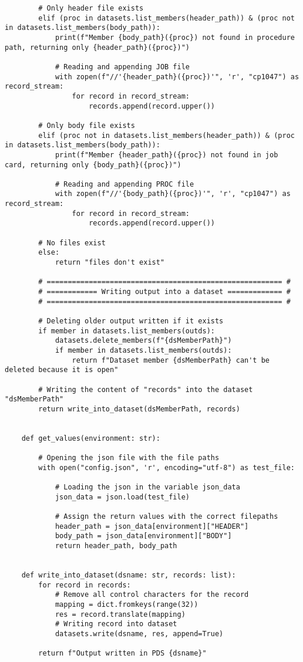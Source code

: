\begin{lstlisting}
        # Only header file exists
        elif (proc in datasets.list_members(header_path)) & (proc not in datasets.list_members(body_path)):
            print(f"Member {body_path}({proc}) not found in procedure path, returning only {header_path}({proc})")
            
            # Reading and appending JOB file
            with zopen(f"//'{header_path}({proc})'", 'r', "cp1047") as record_stream:
                for record in record_stream:
                    records.append(record.upper())
        
        # Only body file exists
        elif (proc not in datasets.list_members(header_path)) & (proc in datasets.list_members(body_path)):
            print(f"Member {header_path}({proc}) not found in job card, returning only {body_path}({proc})")
            
            # Reading and appending PROC file
            with zopen(f"//'{body_path}({proc})'", 'r', "cp1047") as record_stream:
                for record in record_stream:
                    records.append(record.upper())
                    
        # No files exist 
        else:
            return "files don't exist"
        
        # ======================================================== #
        # ============ Writing output into a dataset ============= #
        # ======================================================== #
        
        # Deleting older output written if it exists
        if member in datasets.list_members(outds):
            datasets.delete_members(f"{dsMemberPath}")
            if member in datasets.list_members(outds):
                return f"Dataset member {dsMemberPath} can't be deleted because it is open"
                
        # Writing the content of "records" into the dataset "dsMemberPath"   
        return write_into_dataset(dsMemberPath, records)
    
    
    def get_values(environment: str):
    
        # Opening the json file with the file paths 
        with open("config.json", 'r', encoding="utf-8") as test_file:
        
            # Loading the json in the variable json_data
            json_data = json.load(test_file)
            
            # Assign the return values with the correct filepaths
            header_path = json_data[environment]["HEADER"]
            body_path = json_data[environment]["BODY"] 
            return header_path, body_path
    
    
    def write_into_dataset(dsname: str, records: list):
        for record in records:
            # Remove all control characters for the record
            mapping = dict.fromkeys(range(32))
            res = record.translate(mapping)
            # Writing record into dataset
            datasets.write(dsname, res, append=True)
            
        return f"Output written in PDS {dsname}"
    
    
\end{lstlisting}











